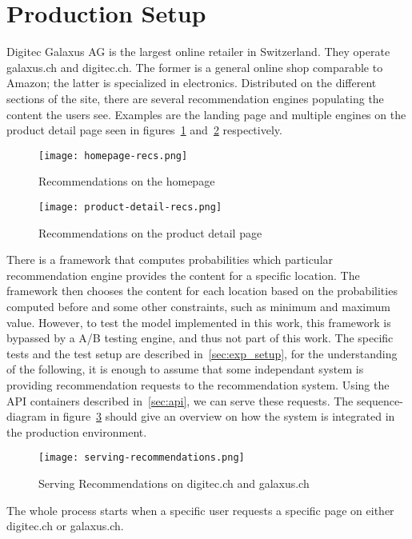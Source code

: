 \section{Production Setup}
Digitec Galaxus AG is the largest online retailer in Switzerland.
They operate galaxus.ch and digitec.ch. 
The former is a general online shop comparable to Amazon; the latter is specialized in electronics.
Distributed on the different sections of the site, there are several recommendation engines populating the content the users see.
Examples are the landing page and multiple engines on the product detail page seen in figures~\ref{fig:homepage_recs} and~\ref{fig:product_detail_recs} respectively.
\begin{figure}[t]
	\centering
	\captionsetup{width=0.8\textwidth}
    \texttt{[image: homepage-recs.png]}
    \caption{Recommendations on the homepage}
    \label{fig:homepage_recs}
\end{figure}
\begin{figure}[t]
	\centering
	\captionsetup{width=0.8\textwidth}
    \texttt{[image: product-detail-recs.png]}
    \caption{Recommendations on the product detail page}
    \label{fig:product_detail_recs}
\end{figure}
There is a framework that computes probabilities which particular recommendation engine provides the content for a specific location.
The framework then chooses the content for each location based on the probabilities computed before and some other constraints, such as minimum and maximum value.
However, to test the model implemented in this work, this framework is bypassed by a A/B testing engine, and thus not part of this work.
The specific tests and the test setup are described in~\ref{sec:exp_setup}, for the understanding of the following, it is enough to assume that some independant system is providing recommendation requests to the recommendation system.
Using the API containers described in~\ref{sec:api}, we can serve these requests.
The sequence-diagram in figure~\ref{fig:serving_recs} should give an overview on how the system is integrated in the production environment.
\begin{figure}[t]
	\centering
	\captionsetup{width=0.8\textwidth}
    \texttt{[image: serving-recommendations.png]}
    \caption{Serving Recommendations on digitec.ch and galaxus.ch}
    \label{fig:serving_recs}
\end{figure}
The whole process starts when a specific user requests a specific page on either digitec.ch or galaxus.ch.
